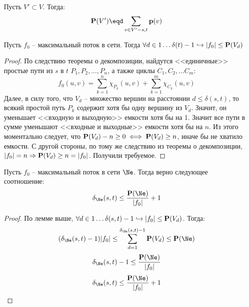 \Def Пусть $V' \subset V$. Тогда:
\begin{equation*}
    \P(V') \eqd \sum\limits_{v \in V' - s, t} \p(v)
\end{equation*}

\St Пусть $f_0$ -- максимальный поток в сети. Тогда $\forall d \in 1 \dots \delta(t) - 1 \hookrightarrow |f_0| \leq \P(V_d)$
\begin{proof}
    
    По следствию теоремы о декомпозиции, найдутся <<единичные>> простые пути из $s$ в $t$ $P_1, P_2, \dots, P_n$, а также циклы $C_1, C_2, \dots C_m:$
    \begin{equation*}
        f_0(u, v) = \sum\limits_{k = 1}^n \chi_{P_k}(u, v) + \sum\limits_{k = 1}^m \chi_{C_k}(u, v)
    \end{equation*}
    Далее, в силу того, что $V_d$ -- множество вершин на расстоянии $d \leq \delta(s, t)$, то всякий простой путь $P_k$ содержит хотя бы одну вершину из $V_d$. Значит, он уменьшает <<входную и выходную>> емкости хотя бы на 1. Значит все пути в сумме уменьшают <<входные и выходные>> емкости хотя бы на $n$.
    Из этого моментально следует, что $\P(V_d) - n \geq 0 \iff \P(V_d) \geq n$, иначе бы не хватило емкости. С другой стороны, по тому же следствию из теоремы о декомпозиции, $|f_0| = n \Rightarrow \P(V_d) \geq n = |f_0|$. Получили требуемое.

\end{proof}

\Lm Пусть $f_0$ -- максимальный поток в сети $\Ne$. Тогда верно следующее соотношение:
\begin{equation*}
    \delta_{\Ne}(s, t) \leq \frac{\P(\Ne)}{|f_0|} + 1
\end{equation*}
\begin{proof}
    
    По лемме выше, $\forall d \in 1 \dots \delta(s, t) - 1 \hookrightarrow |f_0| \leq \P(V_d)$. Тогда:
    \begin{equation*}
        (\delta_\Ne(s, t) - 1) |f_0| \leq \sum\limits_{d = 1}^{\delta_\Ne(s, t) - 1} \P (V_d) \leq \P(\Ne)
    \end{equation*}
    \begin{equation*}
        \delta_\Ne(s, t) - 1 \leq \frac{\P(\Ne)}{|f_0|}
    \end{equation*}
    \begin{equation*}
        \delta_\Ne(s, t) \leq \frac{\P(\Ne)}{|f_0|} + 1
    \end{equation*}

\end{proof}

